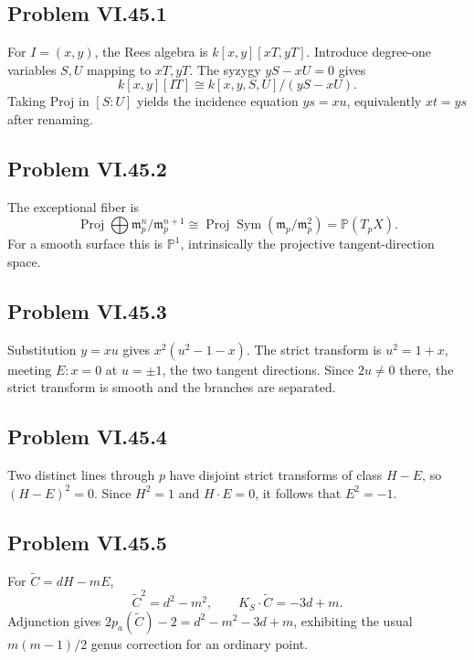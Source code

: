 \subsection*{Problem VI.45.1}
\begin{solution}
For \(I=(x,y)\), the Rees algebra is \(k[x,y][xT,yT]\).  Introduce degree-one variables \(S,U\) mapping to \(xT,yT\).  The syzygy \(yS-xU=0\) gives
\[
k[x,y][IT]\cong k[x,y,S,U]/(yS-xU).
\]
Taking Proj in \([S:U]\) yields the incidence equation \(ys=xu\), equivalently \(xt=ys\) after renaming.
\end{solution}

\subsection*{Problem VI.45.2}
\begin{solution}
The exceptional fiber is
\[
\operatorname{Proj}\bigoplus \mathfrak m_p^n/\mathfrak m_p^{n+1}
\cong\operatorname{Proj}\operatorname{Sym}(\mathfrak m_p/\mathfrak m_p^2)
=\mathbb P(T_pX).
\]
For a smooth surface this is \(\mathbb P^1\), intrinsically the projective tangent-direction space.
\end{solution}

\subsection*{Problem VI.45.3}
\begin{solution}
Substitution \(y=xu\) gives \(x^2(u^2-1-x)\).  The strict transform is \(u^2=1+x\), meeting \(E:x=0\) at \(u=\pm1\), the two tangent directions.  Since \(2u\neq0\) there, the strict transform is smooth and the branches are separated.
\end{solution}

\subsection*{Problem VI.45.4}
\begin{solution}
Two distinct lines through \(p\) have disjoint strict transforms of class \(H-E\), so \((H-E)^2=0\).  Since \(H^2=1\) and \(H\cdot E=0\), it follows that \(E^2=-1\).
\end{solution}

\subsection*{Problem VI.45.5}
\begin{solution}
For \(\widetilde C=dH-mE\),
\[
\widetilde C^2=d^2-m^2,\qquad
K_S\cdot\widetilde C=-3d+m.
\]
Adjunction gives \(2p_a(\widetilde C)-2=d^2-m^2-3d+m\), exhibiting the usual \(m(m-1)/2\) genus correction for an ordinary point.
\end{solution}

